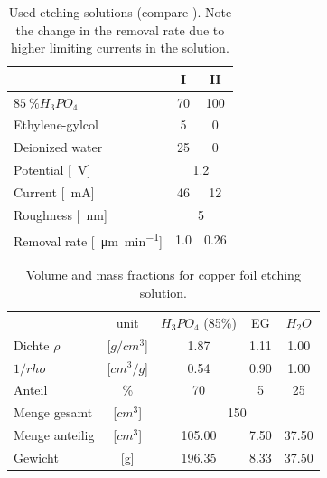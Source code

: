 \begin{table}\centering
\caption{Used etching solutions (compare \cite[130]{jinshan_electrochemical_2004}). Note the change in the removal rate due to higher limiting currents in the solution.}
 \begin{tabular}{lcc}
  & I & II \\ \hline \hline
  $\SI{85}{\percent} H_3PO_4$ & 70 & 100 \\
  Ethylene-gylcol & 5 & 0 \\
  Deionized water & 25 & 0 \\ \hline
  Potential [\SI{}{\V}] & \multicolumn{2}{c}{\SI{1.2}{}} \\
  Current [\SI{}{\mA}] & 46 & 12\\
  Roughness [\SI{}{\nm}] & \multicolumn{2}{c}{\SI{5}{}} \\
  Removal rate [\SI{}{\micro\meter\per\minute}] & \SI{1,0}{} & \SI{0,26}{}\\
 \end{tabular}
\label{table:used-etching-solutions}
\end{table}

\begin{table}
	\centering
	\caption{Volume and mass fractions for copper foil etching solution.}
	\begin{tabular}{lcccc}
		&unit	&$H_3PO_4$ (85\%)&	EG	&	$H_2O$	\\
		Dichte $\rho$   &[$g/cm^3$]	&	1.87	&	1.11	&	1.00	\\
		$1/rho$		&[$cm^3/g$]	&	0.54	&	0.90	&	1.00	\\
		Anteil 		& \%		&	70	&	5	&	25	\\ \hline
		Menge gesamt    &[$cm^3$]	&		\multicolumn{3}{c}{150} 	\\
		Menge anteilig  &[$cm^3$]	&	105.00	&	7.50	&	37.50	\\
		Gewicht         &[g]		&	196.35	&	8.33	&	37.50	\\
	\end{tabular}
	\label{tab:used-etching-solution}
\end{table}

